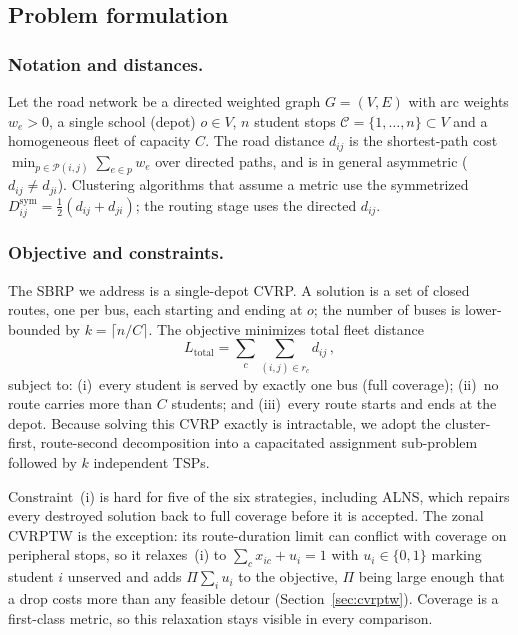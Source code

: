 \documentclass[graybox]{SNmult}
\begin{document}
\subsection{Problem formulation}\label{sec:problem}
\subsubsection{Notation and distances.}
Let the road network be a directed weighted graph $G=(V,E)$ with arc
weights $w_e>0$, a single school (depot) $o\in V$, $n$ student stops
$\mathcal{C}=\{1,\dots,n\}\subset V$ and a homogeneous fleet of capacity
$C$. The road distance $d_{ij}$ is the shortest-path cost
$\min_{p\in\mathcal{P}(i,j)}\sum_{e\in p} w_e$ over directed paths, and is
in general asymmetric ($d_{ij}\neq d_{ji}$). Clustering algorithms that
assume a metric use the symmetrized
$D^{\mathrm{sym}}_{ij}=\tfrac{1}{2}(d_{ij}+d_{ji})$; the routing stage
uses the directed $d_{ij}$.

\subsubsection{Objective and constraints.}
The SBRP we address is a single-depot CVRP. A solution is a set of closed
routes, one per bus, each starting and ending at $o$; the number of buses
is lower-bounded by $k=\lceil n/C\rceil$. The objective minimizes total
fleet distance
\begin{equation}
L_{\mathrm{total}}=\sum_{c}\sum_{(i,j)\in r_c} d_{ij}\,,
\label{eq:obj}
\end{equation}
subject to: (i)~every student is served by exactly one bus (full
coverage); (ii)~no route carries more than $C$ students; and
(iii)~every route starts and ends at the depot. Because solving this
CVRP exactly is intractable, we adopt the cluster-first, route-second
decomposition into a capacitated assignment sub-problem followed by
$k$ independent TSPs.

Constraint~(i) is hard for five of the six strategies, including ALNS,
which repairs every destroyed solution back to full coverage before it is
accepted. The zonal CVRPTW is the exception: its route-duration limit can
conflict with coverage on peripheral stops, so it relaxes~(i) to
$\sum_{c} x_{ic}+u_i=1$ with $u_i\in\{0,1\}$ marking student $i$
unserved and adds $\Pi\sum_i u_i$ to the objective, $\Pi$ being large
enough that a drop costs more than any feasible detour
(Section~\ref{sec:cvrptw}). Coverage is a first-class metric, so this
relaxation stays visible in every comparison.
\end{document}
